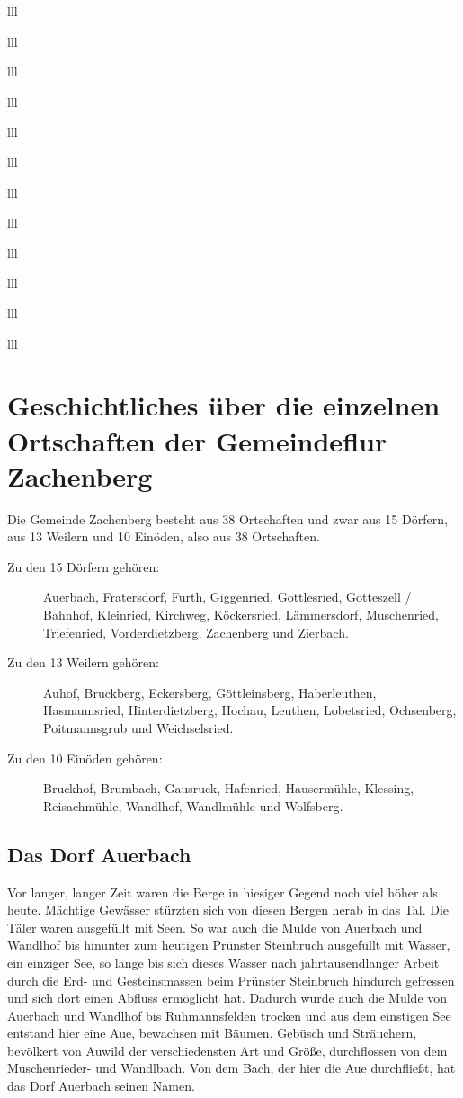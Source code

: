 \documentclass[12pt,a4pager]{book}
\begin{document}
\begin{tabuluar}{lll}
\begin{tabuluar}{lll}
\begin{tabuluar}{lll}
\begin{tabuluar}{lll}
\begin{tabuluar}{lll}
\begin{tabuluar}{lll}
\begin{tabuluar}{lll}
\begin{tabuluar}{lll}
\begin{tabuluar}{lll}
\begin{tabuluar}{lll}
\begin{tabuluar}{lll}
\begin{tabuluar}{lll}
\chapter[Die einzelnen Ortschaften]{Geschichtliches über die einzelnen
Ortschaften der Gemeindeflur Zachenberg}

Die Gemeinde Zachenberg besteht aus 38 Ortschaften und zwar aus 15 Dörfern, aus
13 Weilern und 10 Einöden, also aus 38 Ortschaften.

\begin{description}
\item[Zu den 15 Dörfern gehören:] Auerbach, Fratersdorf, Furth, Giggenried,
Gottlesried, Gotteszell / Bahnhof, Kleinried, Kirchweg, Köckersried,
Lämmersdorf, Muschenried, Triefenried, Vorderdietzberg, Zachenberg und Zierbach.

\item[Zu den 13 Weilern gehören:] Auhof, Bruckberg, Eckersberg, Göttleinsberg,
Haberleuthen, Hasmannsried, Hinterdietzberg, Hochau, Leuthen, Lobetsried,
Ochsenberg, Poitmannsgrub und Weichselsried.

\item[Zu den 10 Einöden gehören:] Bruckhof, Brumbach, Gausruck, Hafenried,
Hausermühle, Klessing, Reisachmühle, Wandlhof, Wandlmühle und Wolfsberg.
\end{description}

\section{Das Dorf Auerbach}

Vor langer, langer Zeit waren die Berge in hiesiger Gegend noch viel höher als
heute. Mächtige Gewässer stürzten sich von diesen Bergen herab in das Tal. Die
Täler waren ausgefüllt mit Seen. So war auch die Mulde von Auerbach und Wandlhof
bis hinunter zum heutigen Prünster Steinbruch ausgefüllt mit Wasser, ein
einziger See, so lange bis sich dieses Wasser nach jahrtausendlanger Arbeit
durch die Erd- und Gesteinsmassen beim Prünster Steinbruch hindurch gefressen
und sich dort einen Abfluss ermöglicht hat. Dadurch wurde auch die Mulde von
Auerbach und Wandlhof bis Ruhmannsfelden trocken und aus dem einstigen See
entstand hier eine Aue, bewachsen mit Bäumen, Gebüsch und Sträuchern, bevölkert
von Auwild der verschiedensten Art und Größe, durchflossen von dem
Muschenrieder- und Wandlbach. Von dem Bach, der hier die Aue durchfließt, hat
das Dorf Auerbach seinen Namen.


\end{tabuluar}
\end{tabuluar}
\end{tabuluar}
\end{tabuluar}
\end{tabuluar}
\end{tabuluar}
\end{tabuluar}
\end{tabuluar}
\end{tabuluar}
\end{tabuluar}
\end{tabuluar}
\end{tabuluar}
\end{document}
